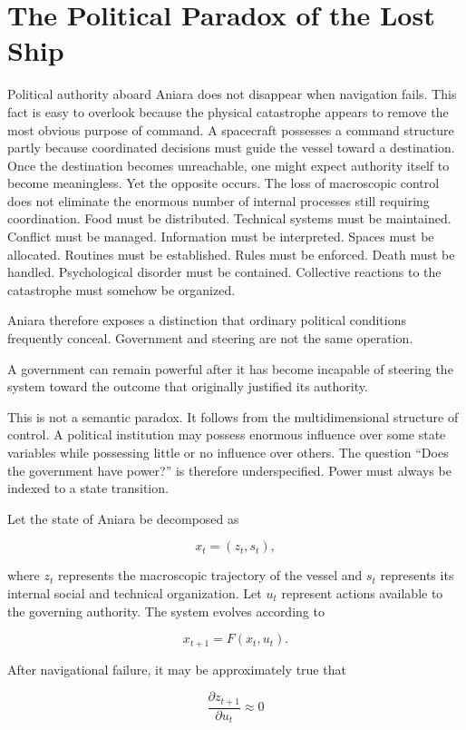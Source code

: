 \documentclass[11pt,oneside]{book}
\theoremstyle{definition}
\theoremstyle{remark}
\begin{document}
\section{The Political Paradox of the Lost Ship}

Political authority aboard Aniara does not disappear when navigation fails. This fact is easy to overlook because the physical catastrophe appears to remove the most obvious purpose of command. A spacecraft possesses a command structure partly because coordinated decisions must guide the vessel toward a destination. Once the destination becomes unreachable, one might expect authority itself to become meaningless. Yet the opposite occurs. The loss of macroscopic control does not eliminate the enormous number of internal processes still requiring coordination. Food must be distributed. Technical systems must be maintained. Conflict must be managed. Information must be interpreted. Spaces must be allocated. Routines must be established. Rules must be enforced. Death must be handled. Psychological disorder must be contained. Collective reactions to the catastrophe must somehow be organized.

Aniara therefore exposes a distinction that ordinary political conditions frequently conceal. Government and steering are not the same operation.

A government can remain powerful after it has become incapable of steering the system toward the outcome that originally justified its authority.

This is not a semantic paradox. It follows from the multidimensional structure of control. A political institution may possess enormous influence over some state variables while possessing little or no influence over others. The question ``Does the government have power?'' is therefore underspecified. Power must always be indexed to a state transition.

Let the state of Aniara be decomposed as

\[
x_t=(z_t,s_t),
\]

where \(z_t\) represents the macroscopic trajectory of the vessel and \(s_t\) represents its internal social and technical organization. Let \(u_t\) represent actions available to the governing authority. The system evolves according to

\[
x_{t+1}=F(x_t,u_t).
\]

After navigational failure, it may be approximately true that

\[
\frac{\partial z_{t+1}}{\partial u_t}\approx0
\]
\end{document}
